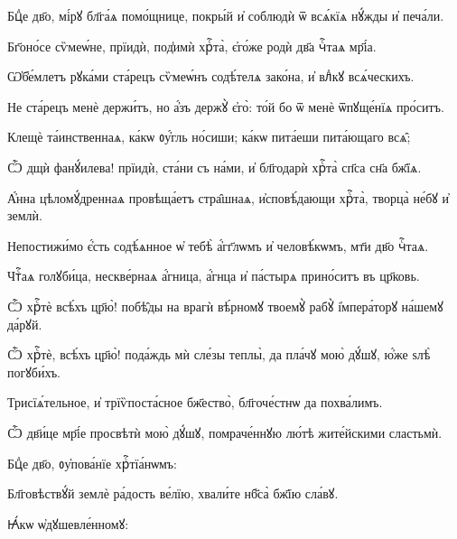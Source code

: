 \hKv Бцⷣе дв҃о, мі́рꙋ бл҃га́ѧ помо́щнице, покры́й и҆ соблюдѝ  ѿ всѧ́кїѧ нꙋ́жды и҆ печа́ли.  

\hKv Бг҃оно́се сѷмеѡ́не, прїидѝ, под̾имѝ хрⷭ҇та̀, є҆го́же  родѝ дв҃а чⷭ҇таѧ мр҃і́а. 

\hKv Ѡ҆б̾е́млетъ рꙋка́ми ста́рецъ сѷмеѡ́нъ содѣ́телѧ зако́на,  и҆ влⷣкꙋ всѧ́ческихъ. 

\hKv Не ста́рецъ менѐ держи́тъ, но а҆́зъ держꙋ̀ є҆го̀: то́й бо  ѿ менѐ ѿпꙋще́нїѧ про́ситъ. 

\hKv Клещѐ та́инственнаѧ, ка́кѡ ᲂу҆́гль но́сиши; ка́кѡ пита́еши  пита́ющаго всѧ̑; 

\hKv Ѽ дщѝ фанꙋ́илева! прїидѝ, ста́ни съ на́ми, и҆ бл҃годарѝ  хрⷭ҇та̀ сп҃са сн҃а бж҃їѧ. 

\hKv А҆́нна цѣломꙋ́дреннаѧ провѣща́етъ стра̑шнаѧ,  и҆сповѣ́дающи хрⷭ҇та̀, творца̀ не́бꙋ и҆ землѝ. 

\hKv Непостижи́мо є҆́сть содѣ́ѧнное ѡ҆ тебѣ̀ а҆́гг҃лѡмъ и҆  человѣ́кѡмъ, мт҃и дв҃о чⷭ҇таѧ. 

\hKv Чтⷭ҇аѧ голꙋби́ца, нескве́рнаѧ а҆́гница, а҆́гнца и҆ па́стырѧ  прино́ситъ въ цр҃ковь. 

\hKv Ѽ хрⷭ҇тѐ всѣ́хъ цр҃ю̀! побѣ̑ды на врагѝ вѣ́рномꙋ  твоемꙋ̀ рабꙋ̀ і҆мпера́торꙋ на́шемꙋ да́рꙋй.  

\hKv Ѽ хрⷭ҇тѐ, всѣ́хъ цр҃ю̀! пода́ждь мѝ сле́зы теплы̀, да  пла́чꙋ мою̀ дꙋ́шꙋ, ю҆́же ѕлѣ̀ погꙋби́хъ. 
%

\hKv Трисїѧ́тельное, и҆ трїѷпоста́сное бж҃ество̀, бл҃гоче́стнѡ  да похва́лимъ. 
%

\hKv Ѽ дв҃и́це мр҃і́е просвѣтѝ мою̀ дꙋ́шꙋ, помраче́ннꙋю лю́тѣ  жите́йскими сластьмѝ.  


\hKv Бцⷣе дв҃о, ᲂу҆пова́нїе  хрⷭ҇тїа́нѡмъ:  


\hKv Бл҃говѣствꙋ́й землѐ ра́дость ве́лїю, хвали́те нб҃са̀ бж҃їю  сла́вꙋ. 

 Ꙗ҆́кѡ ѡ҆дꙋшевле́нномꙋ: 

%

